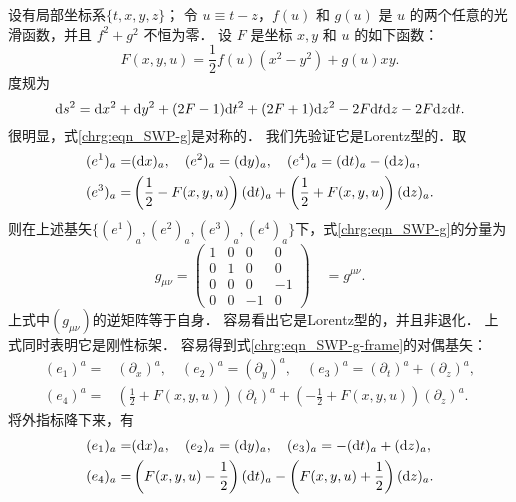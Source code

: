 设有局部坐标系$\{t, x, y, z\}$；
令 $u \equiv t-z$，$f(u)$ 和 $g(u)$ 是 $u$ 的两个任意的光滑函数，并且 $f^2+g^2$ 不恒为零．
设 $F$ 是坐标 $x, y$ 和 $u$ 的如下函数：
\begin{equation}\label{chrg:eqn_SWP-F}
	F(x, y, u)=\frac{1}{2} f(u)\left(x^2-y^2\right)+g(u) x y.
\end{equation}
度规为
\begin{equation}\label{chrg:eqn_SWP-g}
	{\rm d}s^2= {\rm d}x^2 + {\rm d}y^2
	+(2F-1) {\rm d}t^2  + (2F+1){\rm d}z^2
	- 2F {\rm d}t{\rm d}z - 2F {\rm d}z{\rm d}t.
\end{equation}
很明显，式\eqref{chrg:eqn_SWP-g}是对称的．
我们先验证它是Lorentz型的．取
\begin{equation}\label{chrg:eqn_SWP-g-frame}
	\begin{aligned}
	(e^1)_a =& ({\rm d}x)_a,\quad (e^2)_a = ({\rm d}y)_a,\quad 
	(e^4)_a = ({\rm d}t)_a -({\rm d}z)_a, \\
	(e^3)_a =& \left(\frac{1}{2}-F(x, y, u)\right)({\rm d}t)_a 
	+\left(\frac{1}{2}+F(x, y, u)\right)({\rm d}z)_a .
	\end{aligned}
\end{equation}
则在上述基矢$\{(e^1)_a,(e^2)_a,(e^3)_a,(e^4)_a\}$下，式\eqref{chrg:eqn_SWP-g}的分量为
\begin{equation}
	g_{\mu \nu}=\begin{pmatrix}
		1 & 0 & 0 & 0 \\
		0 & 1 & 0 & 0 \\
		0 & 0 & 0 & -1 \\
		0 & 0 & -1 & 0
	\end{pmatrix} \quad  = g^{\mu \nu} .
\end{equation}
上式中$(g_{\mu \nu})$的逆矩阵等于自身．
容易看出它是Lorentz型的，并且非退化．
上式同时表明它是刚性标架．
容易得到式\eqref{chrg:eqn_SWP-g-frame}的对偶基矢：
	\begin{align*}
		(e_1)^{a} =& (\partial_x)^{a},\quad
		(e_2)^{a} = (\partial_y)^{a},    \quad
		(e_3)^{a} = (\partial_t)^{a}+(\partial_z)^{a}, \\
		(e_4)^{a} =& \left(\frac{1}{2}+F(x, y, u)\right) (\partial_t)^{a}
		+\left(-\frac{1}{2}+F(x, y, u)\right)(\partial_z)^{a}.
	\end{align*}
将外指标降下来，有
	\begin{align*}
		(e_1)_{a}=& ({\rm d}x)_{a}, \quad		(e_2)_{a}=({\rm d}y)_{a},\quad 
		(e_3)_{a}=-({\rm d}t)_{a} +({\rm d}z)_{a}, \\
		(e_4)_{a}=&\left(F(x, y, u)-\frac{1}{2}\right) ({\rm d}t)_{a}
		- \left(F(x, y, u)+\frac{1}{2}\right) ({\rm d}z)_{a} .
	\end{align*}
